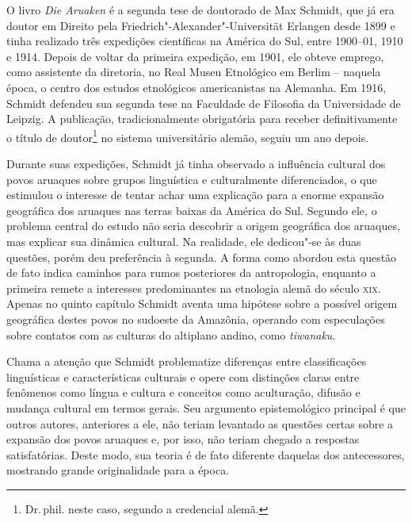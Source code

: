 O livro \textit{Die Aruaken} é a segunda tese de doutorado de Max Schmidt, que já era doutor em Direito pela
Friedrich"-Alexander"-Universität Erlangen desde 1899 e tinha realizado
três expedições científicas na América do Sul, entre 1900--01, 1910 e 1914.
Depois de voltar da primeira expedição, em 1901, ele obteve emprego,
como assistente da diretoria, no Real Museu Etnológico em Berlim --
naquela época, o centro dos estudos etnológicos americanistas na
Alemanha. Em 1916, Schmidt defendeu sua segunda tese na Faculdade de
Filosofia da Universidade de Leipzig. A publicação, tradicionalmente
obrigatória para receber definitivamente o título de doutor\footnote{Dr.\,phil. 
neste caso, segundo a credencial alemã.} no sistema universitário alemão, seguiu um ano depois.

Durante suas expedições, Schmidt já tinha observado a influência cultural
dos povos aruaques sobre grupos linguística e culturalmente
diferenciados, o que estimulou o interesse de tentar achar uma
explicação para a enorme expansão geográfica dos aruaques nas terras
baixas da América do Sul. Segundo ele, o problema central do estudo
não seria descobrir a origem geográfica dos aruaques, mas explicar sua
dinâmica cultural. Na realidade, ele dedicou"-se às duas questões, porém
deu preferência à segunda. A forma como abordou esta questão de fato
indica caminhos para rumos posteriores da antropologia, enquanto a
primeira remete a interesses predominantes na etnologia alemã do século
\textsc{xix}. Apenas no quinto capítulo Schmidt aventa uma hipótese sobre a possível origem geográfica destes povos no sudoeste da Amazônia, operando com
especulações sobre contatos com as culturas do altiplano andino, como
\textit{tiwanaku}.

Chama a atenção que Schmidt problematize diferenças entre classificações
linguísticas e características culturais e opere com distinções claras
entre fenômenos como língua e cultura e conceitos como aculturação,
difusão e mudança cultural em termos gerais. Seu argumento
epistemológico principal é que outros autores, anteriores a ele, não
teriam levantado as questões certas sobre a expansão dos povos aruaques e, por
isso, não teriam chegado a respostas satisfatórias. Deste modo, sua teoria é de fato 
diferente daquelas dos antecessores, mostrando grande
originalidade para a época.


